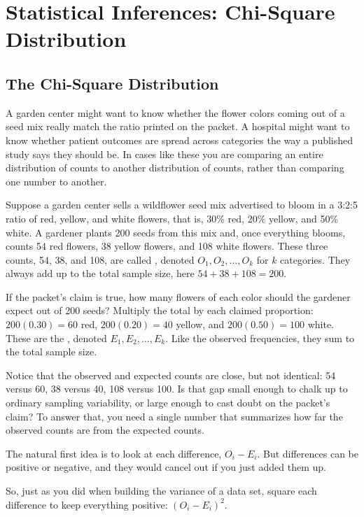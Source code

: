 \chapter{Statistical Inferences: Chi-Square Distribution}
\section{The Chi-Square Distribution}

A garden center might want to know whether the flower colors coming out of a seed mix really match the ratio printed on the packet. A hospital might want to know whether patient outcomes are spread across categories the way a published study says they should be. In cases like these you are comparing an entire distribution of counts to another distribution of counts, rather than comparing one number to another.

Suppose a garden center sells a wildflower seed mix advertised to bloom in a 3:2:5 ratio of red, yellow, and white flowers, that is, 30\% red, 20\% yellow, and 50\% white. A gardener plants 200 seeds from this mix and, once everything blooms, counts 54 red flowers, 38 yellow flowers, and 108 white flowers. These three counts, 54, 38, and 108, are called , denoted $O_1, O_2, \ldots, O_k$ for $k$ categories. They always add up to the total sample size, here $54 + 38 + 108 = 200$.

If the packet's claim is true, how many flowers of each color should the gardener expect out of 200 seeds? Multiply the total by each claimed proportion: $200(0.30) = 60$ red, $200(0.20) = 40$ yellow, and $200(0.50) = 100$ white. These are the , denoted $E_1, E_2, \ldots, E_k$. Like the observed frequencies, they sum to the total sample size.

Notice that the observed and expected counts are close, but not identical: 54 versus 60, 38 versus 40, 108 versus 100. Is that gap small enough to chalk up to ordinary sampling variability, or large enough to cast doubt on the packet's claim? To answer that, you need a single number that summarizes how far the observed counts are from the expected counts.

The natural first idea is to look at each difference, $O_i - E_i$. But differences can be positive or negative, and they would cancel out if you just added them up. 

So, just as you did when building the variance of a data set, square each difference to keep everything positive: $(O_i - E_i)^2$. 

